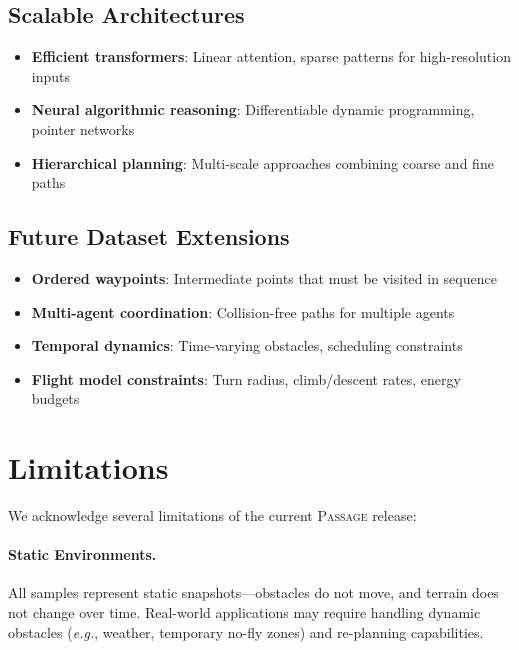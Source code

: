 \documentclass{article}
\newcommand{\dataset}{\textsc{Passage}}
\providecommand{\eg}{\textit{e.g.}}
\begin{document}
\subsection{Scalable Architectures}

\begin{itemize}[noitemsep]
    \item \textbf{Efficient transformers}: Linear attention, sparse patterns for high-resolution inputs
    \item \textbf{Neural algorithmic reasoning}: Differentiable dynamic programming, pointer networks
    \item \textbf{Hierarchical planning}: Multi-scale approaches combining coarse and fine paths
\end{itemize}

\subsection{Future Dataset Extensions}

\begin{itemize}[noitemsep]
    \item \textbf{Ordered waypoints}: Intermediate points that must be visited in sequence
    \item \textbf{Multi-agent coordination}: Collision-free paths for multiple agents
    \item \textbf{Temporal dynamics}: Time-varying obstacles, scheduling constraints
    \item \textbf{Flight model constraints}: Turn radius, climb/descent rates, energy budgets
\end{itemize}

\section{Limitations}
\label{sec:limitations}

We acknowledge several limitations of the current \dataset{} release:

\paragraph{Static Environments.}
All samples represent static snapshots---obstacles do not move, and terrain does not change over time. Real-world applications may require handling dynamic obstacles (\eg, weather, temporary no-fly zones) and re-planning capabilities.
\end{document}
